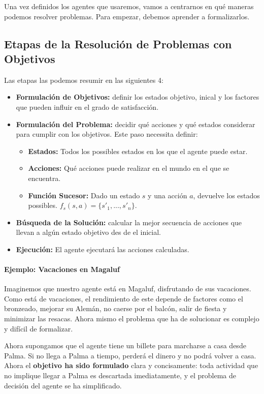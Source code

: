 \documentclass[12pt,a4paper,catalan, leqno]{article} %
\theoremstyle{definition}
\begin{document}
Una vez definidos los agentes que usaremos, vamos a centrarnos en qué maneras podemos resolver problemas. Para empezar, debemos aprender a formalizarlos.

\subsection{Etapas de la Resolución de Problemas con Objetivos}

Las etapas las podemos resumir en las siguientes 4:
\begin{itemize}
    \item \textbf{Formulación de Objetivos:} definir los estados objetivo, inical y los factores que pueden influir en el grado de satisfacción.
    \item \textbf{Formulación del Problema:} decidir qué acciones y qué estados considerar para cumplir con los objetivos. Este paso necessita definir:
    \begin{itemize}
        \item \textbf{Estados:} Todos los possibles estados en los que el agente puede estar.
        \item \textbf{Acciones:} Qué acciones puede realizar en el mundo en el que se encuentra.
        \item \textbf{Función Sucesor:} Dado un estado $s$ y una acción $a$, devuelve los estados possibles. $f_s(s,a) = \{s'_1,...,s'_n\}$.
    \end{itemize}
    \item \textbf{Búsqueda de la Solución:} calcular la mejor secuencia de acciones que llevan a algún estado objetivo des de el inicial.
    \item \textbf{Ejecución:} El agente ejecutará las acciones calculadas.
\end{itemize}

\paragraph{Ejemplo: Vacaciones en Magaluf}

Imaginemos que nuestro agente está en Magaluf, disfrutando de sus vacaciones. Como está de vacaciones, el rendimiento de este depende de factores como el bronzeado, mejorar su Alemán, no caerse por el balcón, salir de fiesta y minimizar las resacas. Ahora mismo el problema que ha de solucionar es complejo y difícil de formalizar.

Ahora supongamos que el agente tiene un billete para marcharse a casa desde Palma. Si no llega a Palma a tiempo, perderá el dinero y no podrá volver a casa. Ahora el \textbf{objetivo ha sido formulado} clara y concisamente: toda actividad que no implique llegar a Palma es descartada imediatamente, y el problema de decisión del agente se ha simplificado.
\end{document}
